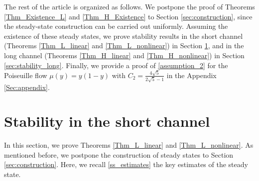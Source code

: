 \documentclass[reqno, 11pt]{amsart}
\theoremstyle{plain}
\theoremstyle{definition}
\theoremstyle{remark}
\numberwithin{equation}{section}
\begin{document}
The rest of the article is organized as follows. We postpone the proof of Theorems \ref{Thm_Existence_L} and \ref{Thm_H_Existence} to Section \ref{sec:construction}, since the steady-state construction can be carried out uniformly. Assuming the existence of these steady states, we prove stability results in the short channel (Theorems \ref{Thm_L_linear} and \ref{Thm_L_nonlinear}) in Section \ref{sec:stability_short}, and in the long channel (Theorems \ref{Thm_H_linear} and \ref{Thm_H_nonlinear}) in Section \ref{sec:stability_long}. Finally, we provide a proof of \eqref{assumption_2} for the Poiseuille flow $\mu(y) = y(1-y)$ with $C_2 =  \frac{4\sqrt{5}}{2 \sqrt{5} - 1}$ in the Appendix \ref{Sec:appendix}.\\





\section{Stability in the short channel}\label{sec:stability_short}


In this section, we prove Theorems \ref{Thm_L_linear} and \ref{Thm_L_nonlinear}. As mentioned before, we postpone the construction of steady states to Section \ref{sec:construction}. Here, we recall \eqref{ss_estimates} the key estimates of the steady state. 
\end{document}
